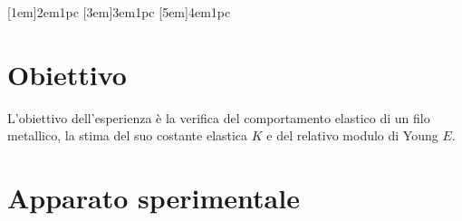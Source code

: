 \documentclass[a4paper,11pt,oneside]{article}
\begin{document}


\tableofcontents
{}
\contentsmargin{6em}
[1em]{\bigskip}{2em}{1pc}
[3em]{\smallskip}{3em}{1pc}
[5em]{\smallskip}{4em}{1pc}


\newpage

\section{Obiettivo}
L'obiettivo dell'esperienza è la verifica del comportamento elastico di un filo metallico, la stima del suo costante elastica $K$ e del relativo modulo di Young $E$.

\section{Apparato sperimentale}\label{section:apparato}
\end{document}

